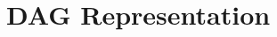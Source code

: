 \documentclass[english,xcolor=svgnames]{beamer}
\begin{document}







\section{DAG Representation}
\end{document}
